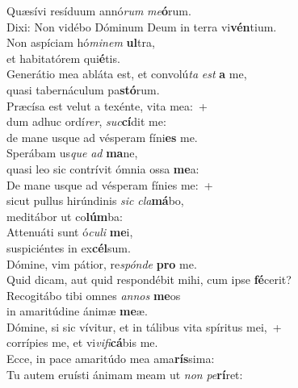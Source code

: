\evenverse Quæsívi resíduum annó\textit{rum} \textit{me}\textbf{ó}rum.~\*\\
\evenverse Dixi: Non vidébo Dóminum Deum in terra vi\textbf{vén}tium.\\
\oddverse Non aspíciam hó\textit{mi}\textit{nem} \textbf{ul}tra,~\*\\
\oddverse et habitatórem qui\textbf{é}tis.\\
\evenverse Generátio mea abláta est, et convolú\textit{ta} \textit{est} \textbf{a} me,~\*\\
\evenverse quasi tabernáculum pa\textbf{stó}rum.\\
\oddverse Præcísa est velut a texénte, vita mea:~+\\
\oddverse  dum adhuc ordí\textit{rer}, \textit{suc}\textbf{cí}dit me:~\*\\
\oddverse de mane usque ad vésperam fíni\textbf{es} me.\\
\evenverse Sperábam us\textit{que} \textit{ad} \textbf{ma}ne,~\*\\
\evenverse quasi leo sic contrívit ómnia ossa \textbf{me}a:\\
\oddverse De mane usque ad vésperam fínies me:~+\\
\oddverse  sicut pullus hirúndinis \textit{sic} \textit{cla}\textbf{má}bo,~\*\\
\oddverse meditábor ut co\textbf{lúm}ba:\\
\evenverse Attenuáti sunt ó\textit{cu}\textit{li} \textbf{me}i,~\*\\
\evenverse suspiciéntes in ex\textbf{cél}sum.\\
\oddverse Dómine, vim pátior, re\textit{spón}\textit{de} \textbf{pro} me.~\*\\
\oddverse Quid dicam, aut quid respondébit mihi, cum ipse \textbf{fé}cerit?\\
\evenverse Recogitábo tibi omnes \textit{an}\textit{nos} \textbf{me}os~\*\\
\evenverse in amaritúdine ánimæ \textbf{me}æ.\\
\oddverse Dómine, si sic vívitur, et in tálibus vita spíritus mei,~+\\
\oddverse  corrípies me, et vi\textit{vi}\textit{fi}\textbf{cá}bis me.~\*\\
\oddverse Ecce, in pace amaritúdo mea ama\textbf{rís}sima:\\
\evenverse Tu autem eruísti ánimam meam ut \textit{non} \textit{pe}\textbf{rí}ret:~\*\\
